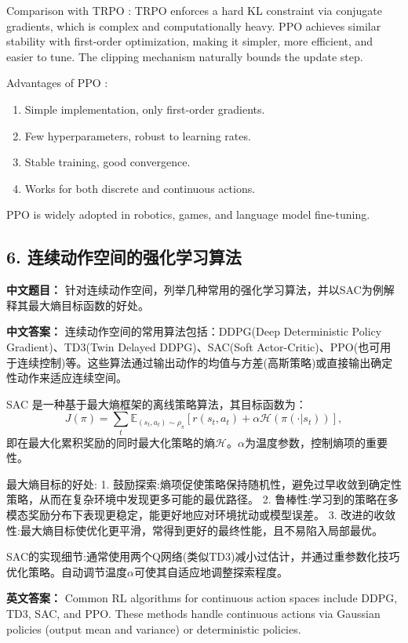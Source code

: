 \documentclass[10pt,a4paper]{ctexart}
\begin{document}
 Comparison with TRPO : TRPO enforces a hard KL constraint via conjugate gradients, which is complex and computationally heavy. PPO achieves similar stability with first-order optimization, making it simpler, more efficient, and easier to tune. The clipping mechanism naturally bounds the update step.

 Advantages of PPO :
\begin{enumerate}
    \item Simple implementation, only first-order gradients.
    \item Few hyperparameters, robust to learning rates.
    \item Stable training, good convergence.
    \item Works for both discrete and continuous actions.
\end{enumerate}

PPO is widely adopted in robotics, games, and language model fine-tuning.

\subsection*{6. 连续动作空间的强化学习算法}
\textbf{中文题目：} 针对连续动作空间，列举几种常用的强化学习算法，并以SAC为例解释其最大熵目标函数的好处。

\textbf{中文答案：}  
连续动作空间的常用算法包括：DDPG(Deep Deterministic Policy Gradient)、TD3(Twin Delayed DDPG)、SAC(Soft Actor-Critic)、PPO(也可用于连续控制)等。这些算法通过输出动作的均值与方差(高斯策略)或直接输出确定性动作来适应连续空间。

 SAC 是一种基于最大熵框架的离线策略算法，其目标函数为：
\[
J(\pi) = \sum_t \mathbb{E}_{(s_t,a_t)\sim\rho_\pi} \left[ r(s_t,a_t) + \alpha \mathcal{H}(\pi(\cdot|s_t)) \right],
\]  
即在最大化累积奖励的同时最大化策略的熵\(\mathcal{H}\)。\(\alpha\)为温度参数，控制熵项的重要性。

 最大熵目标的好处:
1.  鼓励探索:熵项促使策略保持随机性，避免过早收敛到确定性策略，从而在复杂环境中发现更多可能的最优路径。
2.  鲁棒性:学习到的策略在多模态奖励分布下表现更稳定，能更好地应对环境扰动或模型误差。
3.  改进的收敛性:最大熵目标使优化更平滑，常得到更好的最终性能，且不易陷入局部最优。

 SAC的实现细节:通常使用两个Q网络(类似TD3)减小过估计，并通过重参数化技巧优化策略。自动调节温度\(\alpha\)可使其自适应地调整探索程度。

\textbf{英文答案：}  
Common RL algorithms for continuous action spaces include DDPG, TD3, SAC, and PPO. These methods handle continuous actions via Gaussian policies (output mean and variance) or deterministic policies.
\end{document}

